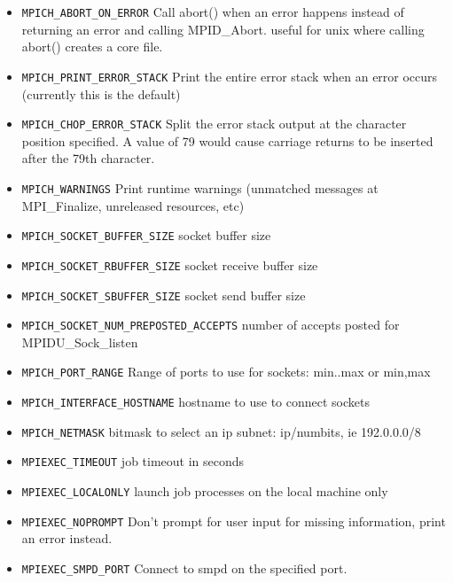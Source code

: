 \documentclass[dvipdfm,11pt]{article}
\begin{document}
\begin{itemize}
\item \texttt{MPICH\_ABORT\_ON\_ERROR}
Call abort() when an error happens instead of returning an error and calling MPID\_Abort. useful for unix where calling abort() creates a core file.
\item \texttt{MPICH\_PRINT\_ERROR\_STACK}
Print the entire error stack when an error occurs (currently this is the default)
\item \texttt{MPICH\_CHOP\_ERROR\_STACK}
Split the error stack output at the character position specified.  A value of 79
would cause carriage returns to be inserted after the 79th character.
\item \texttt{MPICH\_WARNINGS}
Print runtime warnings (unmatched messages at MPI\_Finalize, unreleased resources, etc)
\item \texttt{MPICH\_SOCKET\_BUFFER\_SIZE}
socket buffer size
\item \texttt{MPICH\_SOCKET\_RBUFFER\_SIZE}
socket receive buffer size
\item \texttt{MPICH\_SOCKET\_SBUFFER\_SIZE}
socket send buffer size
\item \texttt{MPICH\_SOCKET\_NUM\_PREPOSTED\_ACCEPTS}
number of accepts posted for MPIDU\_Sock\_listen
\item \texttt{MPICH\_PORT\_RANGE}
Range of ports to use for sockets: min..max or min,max
\item \texttt{MPICH\_INTERFACE\_HOSTNAME}
hostname to use to connect sockets
\item \texttt{MPICH\_NETMASK}
bitmask to select an ip subnet: ip/numbits, ie 192.0.0.0/8
\item \texttt{MPIEXEC\_TIMEOUT}
job timeout in seconds
\item \texttt{MPIEXEC\_LOCALONLY}
launch job processes on the local machine only
\item \texttt{MPIEXEC\_NOPROMPT}
Don't prompt for user input for missing information, print an error instead.
\item \texttt{MPIEXEC\_SMPD\_PORT}
Connect to smpd on the specified port.


\end{itemize}
\end{document}
